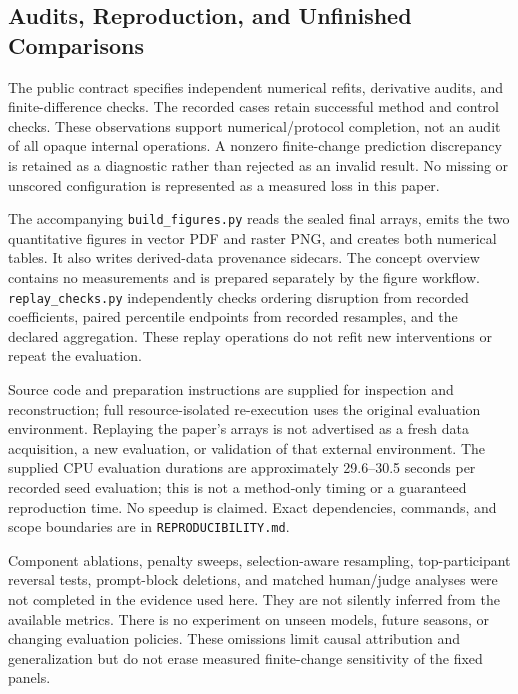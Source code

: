 \documentclass{article}
\begin{document}
\subsection{Audits, Reproduction, and Unfinished Comparisons}
The public contract specifies independent numerical refits, derivative audits, and finite-difference checks. The recorded cases retain successful method and control checks. These observations support numerical/protocol completion, not an audit of all opaque internal operations. A nonzero finite-change prediction discrepancy is retained as a diagnostic rather than rejected as an invalid result. No missing or unscored configuration is represented as a measured loss in this paper.

The accompanying \texttt{build\_figures.py} reads the sealed final arrays, emits the two quantitative figures in vector PDF and raster PNG, and creates both numerical tables. It also writes derived-data provenance sidecars. The concept overview contains no measurements and is prepared separately by the figure workflow. \texttt{replay\_checks.py} independently checks ordering disruption from recorded coefficients, paired percentile endpoints from recorded resamples, and the declared aggregation. These replay operations do not refit new interventions or repeat the evaluation.

Source code and preparation instructions are supplied for inspection and reconstruction; full resource-isolated re-execution uses the original evaluation environment. Replaying the paper's arrays is not advertised as a fresh data acquisition, a new evaluation, or validation of that external environment. The supplied CPU evaluation durations are approximately 29.6--30.5 seconds per recorded seed evaluation; this is not a method-only timing or a guaranteed reproduction time. No speedup is claimed. Exact dependencies, commands, and scope boundaries are in \texttt{REPRODUCIBILITY.md}.

Component ablations, penalty sweeps, selection-aware resampling, top-participant reversal tests, prompt-block deletions, and matched human/judge analyses were not completed in the evidence used here. They are not silently inferred from the available metrics. There is no experiment on unseen models, future seasons, or changing evaluation policies. These omissions limit causal attribution and generalization but do not erase measured finite-change sensitivity of the fixed panels.
\end{document}
